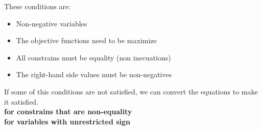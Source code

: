 These conditions are:
\begin{itemize}
    \item Non-negative variables
    \item The objective functions need to be maximize
    \item All constrains must be equality (non inecuations)
    \item The right-hand side values must be non-negatives
\end{itemize}

If some of this conditions are not satisfied, we can convert the equations to make it satisfied.\\
\textbf{for constrains that are non-equality}\\
\textbf{for variables with unrestricted sign}\\

